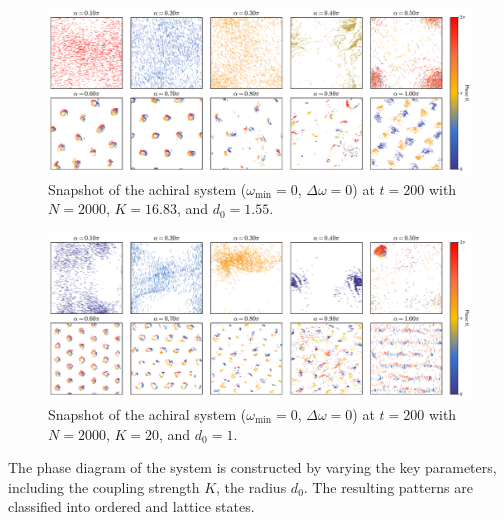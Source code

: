 \documentclass{article}
\begin{document}
\begin{figure}[H]
    \centering
    \includegraphics[width=\textwidth]{./figs/snapshot_v_alpha_K16.83_d01.55.pdf}
    \caption{
        Snapshot of the achiral system ($\omega _{\min}=0$, $\Delta \omega=0$) at $t=200$ with $N=2000$, $K=16.83$, and $d_0=1.55$.
    }
\end{figure}

\begin{figure}[H]
    \centering
    \includegraphics[width=\textwidth]{./figs/snapshot_v_alpha_K20.00_d01.00.pdf}
    \caption{
        Snapshot of the achiral system ($\omega _{\min}=0$, $\Delta \omega=0$) at $t=200$ with $N=2000$, $K=20$, and $d_0=1$.
    }
\end{figure}

\newpage
The phase diagram of the system is constructed by varying the key parameters, including the coupling strength $K$, the radius $d_0$. The resulting patterns are classified into ordered and lattice states. 
\end{document}
